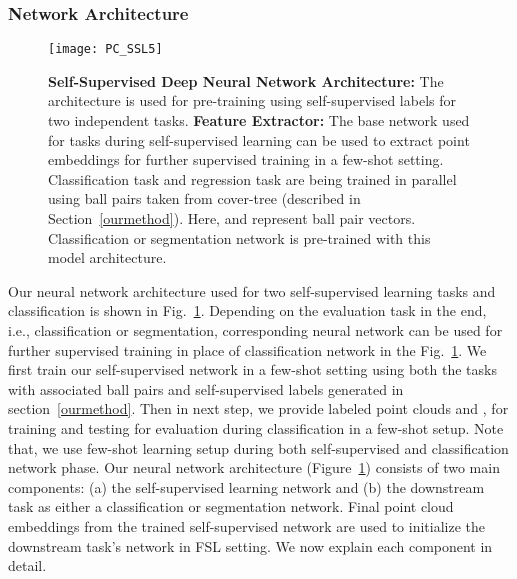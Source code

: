 \documentclass{article}
\begin{document}
\subsubsection{Network Architecture}
\label{ssec:arch}
\begin{figure}[tbp]
	\centering
\texttt{[image: PC\_SSL5]}
	\caption{\textbf{Self-Supervised Deep Neural Network Architecture:} The architecture is used for pre-training using self-supervised labels for two independent tasks. \textbf{Feature Extractor:} The base network used for tasks during self-supervised learning can be used to extract point embeddings for further supervised training in a few-shot setting. Classification task  and regression task  are being trained in parallel using ball pairs taken from cover-tree  (described in Section~\ref{ourmethod}). Here,  and  represent ball pair vectors. Classification or segmentation network is pre-trained with this model architecture.}
	\label{fig:arch}
\end{figure}
Our neural network architecture used for two self-supervised learning tasks and classification is shown in Fig.~\ref{fig:arch}. Depending on the evaluation task in the end, i.e., classification or segmentation, corresponding neural network can be used for further supervised training in place of classification network in the Fig.~\ref{fig:arch}. We first train our self-supervised network in a few-shot setting using both the tasks with associated ball pairs and self-supervised labels generated in section~\ref{ourmethod}. Then in next step, we provide labeled point clouds  and , for training and testing for evaluation during classification in a few-shot setup. Note that, we use few-shot learning setup during both self-supervised and classification network phase.
\fi
Our neural network architecture (Figure~\ref{fig:arch}) consists of two main components: (a) the self-supervised learning network and (b) the downstream task as either a classification or segmentation network. Final point cloud embeddings from the trained self-supervised network are used to initialize the downstream task's network in FSL setting. We now explain each component in detail.
\end{document}
